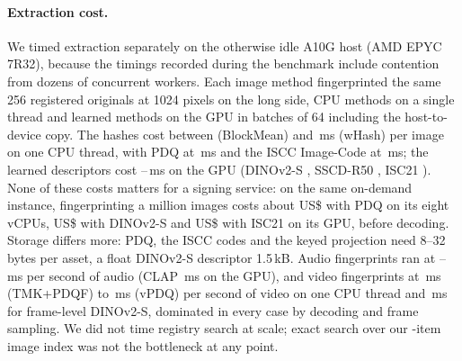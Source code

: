 \paragraph{Extraction cost.} We timed extraction separately on the otherwise idle A10G host (AMD EPYC 7R32), because the timings recorded during the benchmark include contention from dozens of concurrent workers. Each image method fingerprinted the same 256 registered originals at 1024 pixels on the long side, CPU methods on a single thread and learned methods on the GPU in batches of 64 including the host-to-device copy. The hashes cost between  (BlockMean) and \,ms (wHash) per image on one CPU thread, with PDQ at \,ms and the ISCC Image-Code at \,ms; the learned descriptors cost --\,ms on the GPU (DINOv2-S , SSCD-R50 , ISC21 ). None of these costs matters for a signing service: on the same on-demand instance, fingerprinting a million images costs about US\$ with PDQ on its eight vCPUs, US\$ with DINOv2-S and US\$ with ISC21 on its GPU, before decoding. Storage differs more: PDQ, the ISCC codes and the keyed projection need 8--32 bytes per asset, a float DINOv2-S descriptor 1.5\,kB. Audio fingerprints ran at --\,ms per second of audio (CLAP \,ms on the GPU), and video fingerprints at \,ms (TMK+PDQF) to \,ms (vPDQ) per second of video on one CPU thread and \,ms for frame-level DINOv2-S, dominated in every case by decoding and frame sampling. We did not time registry search at scale; exact search over our -item image index was not the bottleneck at any point.
